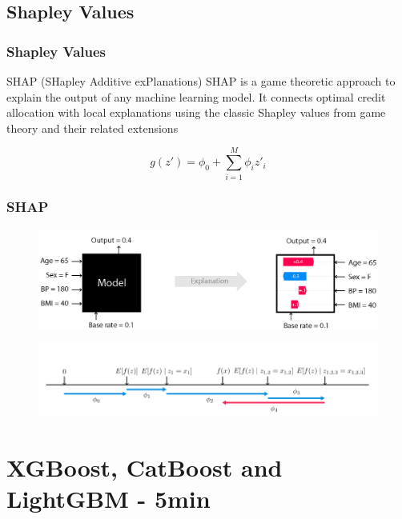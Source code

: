 \documentclass{beamer}
\begin{document}
\subsection{Shapley Values}
\begin{frame}
\frametitle{Shapley Values}
\begin{block}{SHAP (SHapley Additive exPlanations)}
SHAP is a game theoretic approach to explain the output of any machine learning model. It connects optimal credit allocation with local explanations using the classic Shapley values from game theory and their related extensions
\end{block}
\begin{equation*}
    g(z') = \phi_{0} + \sum_{i=1}^{M} \phi_{i}z'_{i}
\end{equation*}
\end{frame}
\begin{frame}
\frametitle{SHAP}
\begin{figure}[h]
 \centering
 \includegraphics[scale=0.18]{exemplo_shap_black.png}
\end{figure}
\begin{figure}[h]
 \centering
 \includegraphics[scale=0.3]{shap_value_artigo.png}
\end{figure}
\end{frame}
\section{XGBoost, CatBoost and LightGBM - 5min}
\end{document}

